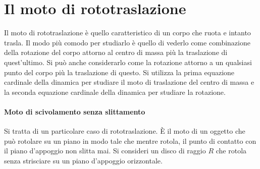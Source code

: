 \section{Il moto di rototraslazione}

Il moto di rototraslazione è quello caratteristico di un corpo che ruota e intanto trasla. Il modo più comodo per studiarlo è quello di vederlo come combinazione della rotazione del corpo attorno al centro di massa più la traslazione di quest'ultimo. Si può anche considerarlo come la rotazione attorno a un qualsiasi punto del corpo più la traslazione di questo. Si utilizza la prima equazione cardinale della dinamica per studiare il moto di traslazione del centro di massa e la seconda equazione cardinale della dinamica per studiare la rotazione.

\paragraph{Moto di scivolamento senza slittamento} Si tratta di un particolare caso di rototraslazione. È il moto di un oggetto che può rotolare su un piano in modo tale che mentre rotola, il punto di contatto con il piano d'appoggio non slitta mai. Si consideri un disco di raggio $R$ che rotola senza strisciare su un piano d'appoggio orizzontale.

